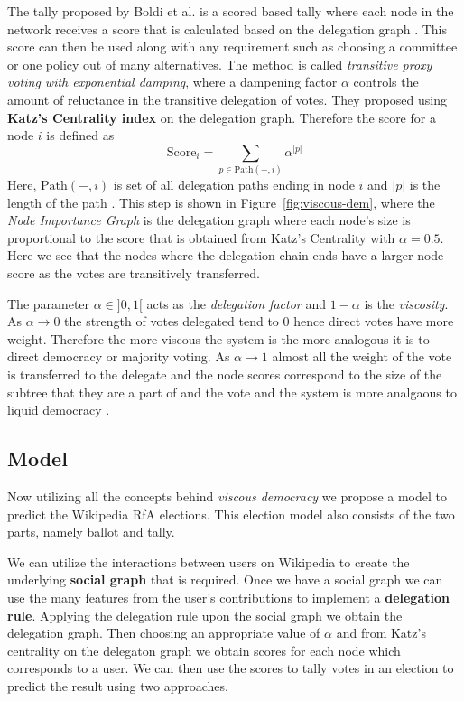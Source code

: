 The tally proposed by Boldi et al. is a scored based tally where each node in the network receives a score that is calculated based on the delegation graph \cite{ViscousDemocracy}. This score can then be used along with any requirement such as choosing a committee or one policy out of many alternatives. The method is called \textit{transitive proxy voting with exponential damping}, where a dampening factor $\alpha$ controls the amount of reluctance in the transitive delegation of votes. They proposed using \textbf{Katz's Centrality index} on the delegation graph. Therefore the score for a node $i$ is defined as 
\[\text{Score}_{i}  = \sum_{p \in \text{Path}(-,i)} \alpha^{|p|}\]
Here, $\text{Path}(-,i)$ is set of all delegation paths ending in node $i$ and $|p|$ is the length of the path \cite{ViscousDemocracy}. This step is shown in Figure~\ref{fig:viscous-dem}, where the \textit{Node Importance Graph} is the delegation graph where each node's size is proportional to the score that is obtained from Katz's Centrality with $\alpha=0.5$. Here we see that the nodes where the delegation chain ends have a larger node score as the votes are transitively transferred.

The parameter $\alpha\in ]0,1[$ acts as the \textit{delegation factor} and $1-\alpha$ is the \textit{viscosity}. As $\alpha\rightarrow 0$ the strength of votes delegated tend to $0$ hence direct votes have more weight. Therefore the more viscous the system is the more analogous it is to direct democracy or majority voting. As $\alpha\rightarrow 1$ almost all the weight of the vote is transferred to the delegate and the node scores correspond to the size of the subtree that they are a part of and the vote and the system is more analgaous to liquid democracy \cite{ViscousDemocracy}.

\subsection{Model} 
Now utilizing all the concepts behind \textit{viscous democracy} we propose a model to predict the Wikipedia RfA elections. This election model also consists of the two parts, namely ballot and tally. 

We can utilize the interactions between users on Wikipedia to create the underlying \textbf{social graph} that is required. Once we have a social graph we can use the many features from the user's contributions to implement a \textbf{delegation rule}. Applying the delegation rule upon the social graph we obtain the delegation graph. Then choosing an appropriate value of $\alpha$ and from Katz's centrality on the delegaton graph we obtain scores for each node which corresponds to a user. We can then use the scores to tally votes in an election to predict the result using two approaches.

